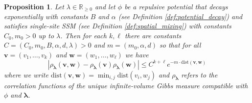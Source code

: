 \documentclass[10pt]{amsart}
\newtheorem{proposition}[theorem]{Proposition}
\theoremstyle{definition}
\theoremstyle{remark}
\newcommand{\blambda}{{\boldsymbol{\lambda}}}
\newcommand{\dist}{\mathrm{dist}}
\newcommand{\R}{\mathbb{R}}
\newcommand{\potential}{\phi}
\newcommand{\activity}{\lambda}
\begin{document}
	\begin{proposition}\label{prop:exponential-decay-k-point}
		Let $\activity \in \R_{\ge 0}$ and let $\potential$ be a repulsive potential that decays exponentially with constants $B$ and $\alpha$ (see Definition \ref{def:potential_decay}) and satisfies single-site SSM (see Definition \ref{def:spatial_mixing}) with constants $C_0,m_0 > 0$ up to $\lambda$.  
		Then for each $k,\ell$ there are constants $C = (C_0,m_0,B,\alpha,d,\lambda) > 0$ and $m = (m_0,\alpha,d)$ so that for all $\mathbf{v} = (v_1,\ldots,v_k)$ and $\mathbf{w} = (w_1,\ldots,w_\ell)$ we have \begin{equation*}
			\left|\rho_{\blambda}(\mathbf{v},\mathbf{w}) - \rho_{\blambda}(\mathbf{v})\rho_{\blambda}(\mathbf{w}) \right| \leq C^{k + \ell} e^{-m \cdot\dist(\mathbf{v},\mathbf{w})}
		\end{equation*}
		where we write $\dist(\mathbf{v},\mathbf{w}) = \min_{i,j} \dist(v_i,w_j)$ and $\rho_{\blambda}$ refers to the correlation functions of the unique infinite-volume Gibbs measure compatible with $\phi$ and $\blambda$.
	\end{proposition}
\end{document}

